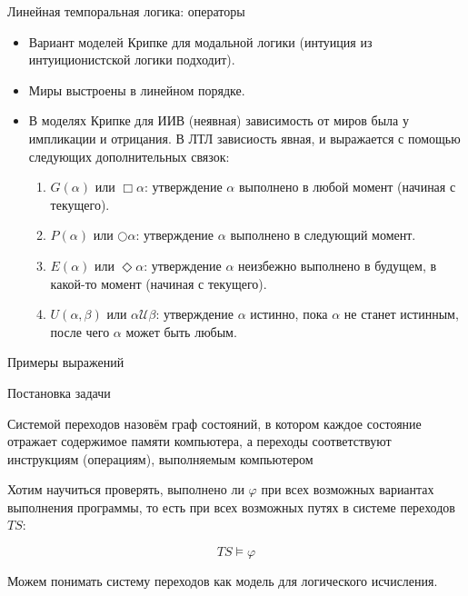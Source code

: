 \documentclass[aspectratio=169,dvipsnames,usenames]{beamer}
\begin{document}
\begin{frame}{Линейная темпоральная логика: операторы}
\begin{itemize}
\item Вариант моделей Крипке для модальной логики (интуиция из интуиционистской логики подходит).
\item Миры выстроены в линейном порядке.
\item В моделях Крипке для ИИВ (неявная) зависимость от миров была у импликации и отрицания.
В ЛТЛ зависиость явная, и выражается с помощью следующих дополнительных связок:
\begin{enumerate}
\item $G(\alpha)$ или $\Box\alpha$: утверждение $\alpha$ выполнено в любой момент (начиная с текущего).
\item $P(\alpha)$ или $\bigcirc\alpha$: утверждение $\alpha$ выполнено в следующий момент.
\item $E(\alpha)$ или $\Diamond\alpha$: утверждение $\alpha$ неизбежно выполнено в будущем, в какой-то момент (начиная с текущего).
\item $U(\alpha,\beta)$ или $\alpha\mathcal{U}\beta$: утверждение $\alpha$ истинно, пока $\alpha$ не станет истинным,
после чего $\alpha$ может быть любым.
\end{enumerate}
\end{itemize}
\end{frame}

\begin{frame}{Примеры выражений}
\end{frame}

\begin{frame}{Постановка задачи}
\begin{dfn}Системой переходов назовём граф состояний, в котором каждое состояние отражает
содержимое памяти компьютера, а переходы соответствуют инструкциям (операциям), выполняемым
компьютером\end{dfn}

Хотим научиться проверять, выполнено ли $\varphi$ при всех возможных вариантах выполнения программы,
то есть при всех возможных путях в системе переходов $TS$:

$$TS \models \varphi$$

Можем понимать систему переходов как модель для логического исчисления.
\end{frame}
\end{document}
